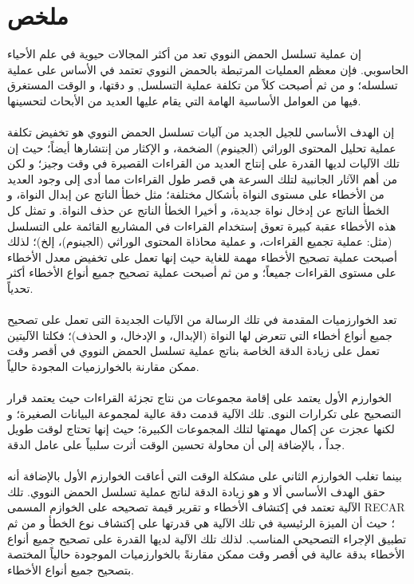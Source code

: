 \documentclass[12pt]{llncs}
\begin{document}
\section*{ملخص}
إن عملية تسلسل الحمض النووي تعد من أكثر المجالات حيوية في علم الأحياء الحاسوبي. فإن معظم العمليات المرتبطة بالحمض النووي تعتمد في الأساس على عملية تسلسله؛ و من ثم أصبحت كلاً من تكلفة عملية التسلسل, و دقتها، و الوقت المستغرق فيها من العوامل الأساسية الهامة التي يقام عليها العديد من الأبحاث لتحسينها.
\\
\\
إن الهدف الأساسي للجيل الجديد من آليات تسلسل الحمض النووي هو تخفيض تكلفة عملية تحليل المحتوى الوراثي (الجينوم) الضخمة، و الإكثار من إنتشارها أيضاً؛ حيث إن تلك الآليات لديها القدرة على إنتاج العديد من القراءات القصيرة في وقت وجيز؛ و لكن من أهم الآثار الجانبية لتلك السرعة هي قصر طول القراءات مما أدى إلى وجود العديد من الأخطاء على مستوى النواة بأشكال مختلفة؛ مثل خطأ الناتج عن إبدال النواة، و الخطأ الناتج عن إدخال نواة جديدة، و أخيرا الخطأ الناتج عن حذف النواة. و تمثل كل هذه الأخطاء عقبة كبيرة تعوق إستخدام القراءات في المشاريع القائمة على التسلسل (مثل:  عملية تجميع القراءات، و عملية محاذاة المحتوى الوراثي (الجينوم)، إلخ)؛ لذلك أصبحت عملية تصحيح الأخطاء مهمة للغاية حيث إنها تعمل على تخفيض معدل الأخطاء على مستوى القراءات جميعاً؛ و من ثم أصبحت عملية تصحيح جميع أنواع الأخطاء أكثر تحدياً.
\\
\\ 
 تعد الخوارزميات المقدمة في تلك الرسالة من الآليات الجديدة التى تعمل على تصحيح جميع أنواع أخطاء التي تتعرض لها النواة (الإبدال، و الإدخال، و الحذف)؛ فكلتا الآليتين تعمل على زيادة الدقة الخاصة بناتج عملية تسلسل الحمض النووي في أقصر وقت ممكن مقارنة بالخوارزميات المجودة حالياً.
\\
\\
الخوارزم الأول يعتمد على إقامة مجموعات من نتاج تجزئة القراءات حيث يعتمد قرار التصحيح على تكرارات النوى. تلك الآلية قدمت دقة عالية لمجموعة البيانات الصغيرة؛ و لكنها عجزت عن إكمال مهمتها لتلك المجموعات الكبيرة؛ حيث إنها تحتاج لوقت طويل جداً ، بالإضافة إلى أن محاولة تحسين الوقت أثرت سلبياً على عامل الدقة.
\\
\\
 بينما تغلب الخوارزم الثاني على مشكلة الوقت التي أعاقت الخوارزم الأول بالإضافة أنه حقق الهدف الأساسي ألا و هو زيادة الدقة لناتج عملية تسلسل الحمض النووي. تلك الآلية تعتمد في إكتشاف الأخطاء و تقرير قيمة تصحيحه على الخوازم المسمى 
 RECAR 
 ؛ حيث أن الميزة الرئيسية في تلك الآلية هي قدرتها على إكتشاف نوع الخطأ و من ثم تطبيق الإجراء التصحيحي المناسب. لذلك تلك الآلية لديها القدرة على تصحيح جميع أنواع الأخطاء بدقة عالية في أقصر وقت ممكن مقارنةً بالخوارزميات الموجودة حالياً المختصة بتصحيح جميع أنواع الأخطاء.
\end{document}
